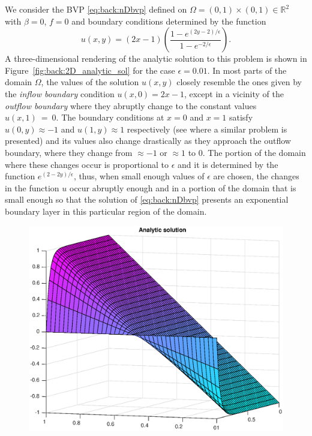 \begin{example}
We consider the BVP \eqref{eq:back:nDbvp} defined on $\Omega=(0,1)\times(0,1)\in\mathbb{R}^{2}$ with $\beta=0$, $f=0$ and boundary conditions determined by the function
%
\begin{equation}\label{analytic_solution}
u(x,y)=(2x-1)\left(\frac{1-e^{(2y-2)/\epsilon}}{1-e^{-2/\epsilon}}\right).
\end{equation}
%
A three-dimensional rendering of the analytic solution to this problem is
shown in Figure~\ref{fig:back:2D_analytic_sol} for the case $\epsilon=0.01$.
In most parts of the domain $\Omega$, the values of the solution $u(x,y)$
closely resemble the ones given by the \emph{inflow boundary} condition
$u(x,0)=2x-1$, except in a vicinity of the \emph{outflow boundary} where they
abruptly change to the constant values $u(x,1)~=~0$. The boundary conditions at
$x=0$ and $x=1$ satisfy $u(0,y)\approx-1$ and $u(1,y)\approx 1$ respectively
(see \cite[Example 6.1.1]{ElmSilWat14} where a similar problem is presented)
and its values also change drastically as they approach the outflow
boundary, where they change from $\approx-1$ or $\approx 1$ to $0$.
The portion of the domain where these changes occur is proportional to
$\epsilon$ and it is determined by the function $e^{(2-2y)/\epsilon}$, thus,
when small enough values of $\epsilon$ are chosen, the changes in the function
$u$ occur abruptly enough and in a portion of the domain that is small enough
so that the solution of \eqref{eq:back:nDbvp} presents an exponential boundary
layer in this particular region of the domain.
%
\begin{figure}[h!]
\begin{minipage}[t]{0.5\linewidth}
\includegraphics[width=0.83\linewidth]{figures/analytic_sol_new}

\end{minipage}
\end{figure}
\end{example}
